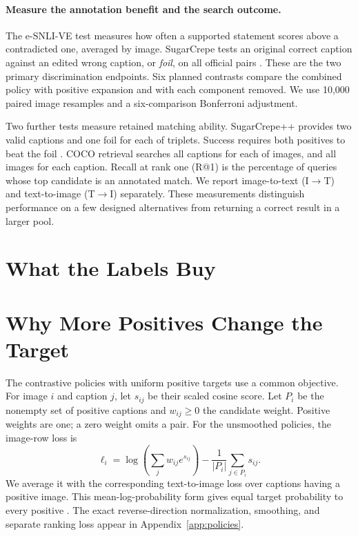 \documentclass[11pt]{article}
\begin{document}
\paragraph{Measure the annotation benefit and the search outcome.}
The e-SNLI-VE test measures how often a supported statement scores above a contradicted one, averaged by image. SugarCrepe tests an original correct caption against an edited wrong caption, or \emph{foil}, on all \SugarPairCount{} official pairs \citep{hsieh2023sugarcrepe}. These are the two primary discrimination endpoints. Six planned contrasts compare the combined policy with positive expansion and with each component removed. We use 10,000 paired image resamples and a six-comparison Bonferroni adjustment.

Two further tests measure retained matching ability. SugarCrepe++ provides two valid captions and one foil for each of \SugarPpTripletCount{} triplets. Success requires both positives to beat the foil \citep{dumpala2024sugarcrepepp}. COCO retrieval searches all \CocoTextCount{} captions for each of \CocoImageCount{} images, and all images for each caption. Recall at rank one (R@1) is the percentage of queries whose top candidate is an annotated match. We report image-to-text (I$\to$T) and text-to-image (T$\to$I) separately. These measurements distinguish performance on a few designed alternatives from returning a correct result in a larger pool.

\section{What the Labels Buy}
\label{sec:results}


\section{Why More Positives Change the Target}
\label{sec:theory}
The contrastive policies with uniform positive targets use a common objective. For image $i$ and caption $j$, let $s_{ij}$ be their scaled cosine score. Let $P_i$ be the nonempty set of positive captions and $w_{ij}\geq0$ the candidate weight. Positive weights are one; a zero weight omits a pair. For the unsmoothed policies, the image-row loss is
\begin{equation}
\ell_i=\log\!\left(\sum_jw_{ij}e^{s_{ij}}\right)-\frac{1}{|P_i|}\sum_{j\in P_i}s_{ij}.
\label{eq:row}
\end{equation}
We average it with the corresponding text-to-image loss over captions having a positive image. This mean-log-probability form gives equal target probability to every positive \citep{khosla2020supervised}. The exact reverse-direction normalization, smoothing, and separate ranking loss appear in Appendix~\ref{app:policies}.
\end{document}
